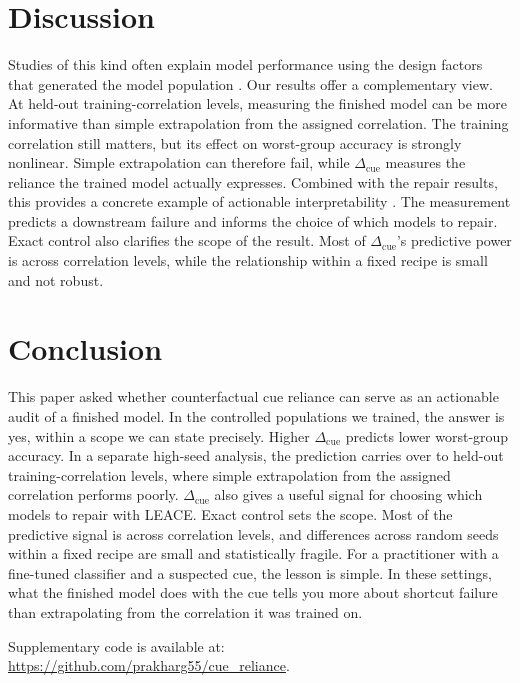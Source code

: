 \documentclass[11pt]{article}
\newcommand{\cued}{\ensuremath{\Delta_{\mathrm{cue}}}}
\begin{document}
\section{Discussion}

Studies of this kind often explain model performance using the design factors
that generated the model population
\citep{morris2019simulation,jiang2020fantastic}. Our results offer a complementary view. At held-out training-correlation levels, measuring the
finished model can be more informative than simple extrapolation from the
assigned correlation. The training correlation still matters, but its effect on worst-group accuracy is strongly nonlinear. Simple extrapolation can therefore fail, while
\cued{} measures the reliance the trained model actually expresses. Combined with the repair results, this provides a concrete
example of actionable interpretability \citep{orgad2026actionable}. The measurement predicts a downstream failure and informs the choice of which models to repair. Exact control also clarifies the scope of the result.
Most of \cued{}'s predictive power is across correlation levels, while the
relationship within a fixed recipe is small and not robust.


\section{Conclusion}

This paper asked whether counterfactual cue reliance can serve as an
actionable audit of a finished model. In the controlled populations we trained, the answer is yes, within a scope we can state precisely. Higher \cued{} predicts
lower worst-group accuracy. In a separate high-seed analysis, the prediction
carries over to held-out training-correlation levels, where simple
extrapolation from the assigned correlation performs poorly. \cued{} also gives a useful signal for choosing which models to repair with LEACE. Exact control sets the scope. Most of the predictive signal is across correlation levels,
and differences across random seeds within a fixed recipe are small and
statistically fragile. For a practitioner with a fine-tuned classifier and a
suspected cue, the lesson is simple. In these settings, what the finished
model does with the cue tells you more about shortcut failure than
extrapolating from the correlation it was trained on.

\noindent Supplementary code is available at:\\
\url{https://github.com/prakharg55/cue_reliance}.
\end{document}
